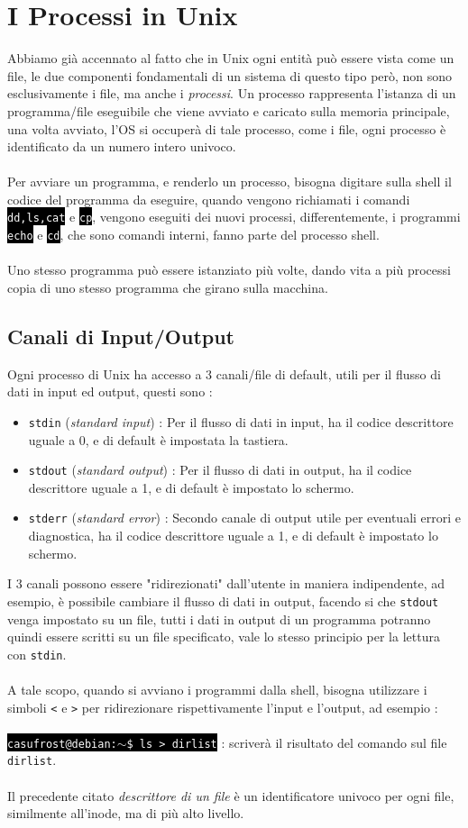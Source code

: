 \documentclass[12pt, letterpaper]{article}
\makeatletter
\newcommand{\code}[1]{\colorbox{light-gray}{\texttt{#1}}}
\newcommand{\shelll}[1]{\colorbox{black}{\textcolor{white}{\texttt{#1}}}}
\newcommand{\shell}[1]{\colorbox{black}{\textcolor{white}{\texttt{casufrost@debian:$\sim$\$ #1}}}}
\newcommand{\acc}{\\\hphantom{}\\}
\makeatother
\begin{document}
\section{I Processi in Unix}
Abbiamo già accennato al fatto che in Unix ogni entità può essere vista come un file, le due componenti fondamentali di un 
sistema di questo tipo però, non sono esclusivamente i file, ma anche i \textit{processi}. Un processo 
rappresenta l'istanza di un programma/file eseguibile che viene avviato e caricato sulla memoria
principale, una volta avviato, l'OS si occuperà di tale processo, come i file, ogni processo è identificato da un numero 
intero univoco.\acc 
Per avviare un programma, e renderlo un processo, bisogna digitare sulla shell il codice del programma da eseguire, quando 
vengono richiamati i comandi \shelll{dd,ls,cat} e \shelll{cp}, vengono eseguiti dei nuovi processi, differentemente, i 
programmi \shelll{echo} e \shelll{cd}, che sono comandi interni, fanno parte del processo shell.\acc 
Uno stesso programma può essere istanziato più volte, dando vita a più processi copia di uno stesso programma che girano sulla 
macchina.
\subsection{Canali di Input/Output}
Ogni processo di Unix ha accesso a 3 canali/file di default, utili per il flusso di dati in input ed output, questi sono : \begin{itemize}
    \item \code{stdin} (\textit{standard input}) : Per il flusso di dati in input, ha il codice descrittore uguale a 0, e di default è impostata 
    la tastiera.
    \item \code{stdout} (\textit{standard output}) : Per il flusso di dati in output, ha il codice descrittore uguale a 1, e di default
    è impostato lo schermo.
    \item \code{stderr} (\textit{standard error}) : Secondo canale di output utile per eventuali errori e diagnostica, 
    ha il codice descrittore uguale a 1, e di default è impostato lo schermo.
\end{itemize}
I 3 canali possono essere "ridirezionati" dall'utente in maniera indipendente, ad esempio, è possibile cambiare il flusso di dati 
in output, facendo si che \code{stdout} venga impostato su un file, tutti i dati in output di un programma potranno quindi 
essere scritti su un file specificato, vale lo stesso principio per la lettura con \code{stdin}.\acc A tale scopo, quando 
si avviano i programmi dalla shell, bisogna utilizzare i simboli \code{<} e \code{>} per ridirezionare rispettivamente 
l'input e l'output, ad esempio : \acc 
\shell{ls > dirlist} : scriverà il risultato del comando sul file \code{dirlist}.\acc 
Il precedente citato \textit{descrittore di un file} è un identificatore univoco per ogni file, similmente all'inode, ma di 
più alto livello.
\end{document}

